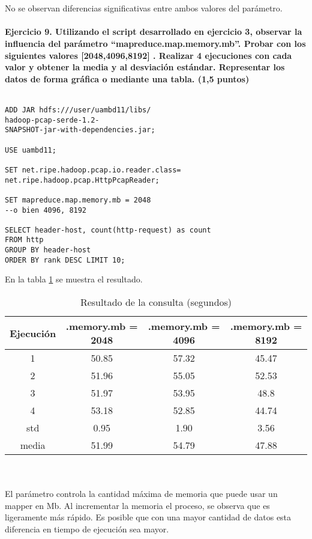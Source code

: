 \\\\
No se observan diferencias significativas entre ambos valores del parámetro.
\\\\
\textbf{Ejercicio 9. Utilizando el script desarrollado en ejercicio 3, observar la influencia del parámetro
	“mapreduce.map.memory.mb”. Probar con los siguientes valores [2048,4096,8192] . Realizar 4
	ejecuciones con cada valor y obtener la media y al desviación estándar. Representar los datos de
	forma gráfica o mediante una tabla. (1,5 puntos)}\\\\
\begin{lstlisting}[caption=Consulta para obtener el ranking de hosts (ampliado)]
ADD JAR hdfs:///user/uambd11/libs/
hadoop-pcap-serde-1.2-
SNAPSHOT-jar-with-dependencies.jar;

USE uambd11;

SET net.ripe.hadoop.pcap.io.reader.class=
net.ripe.hadoop.pcap.HttpPcapReader;

SET mapreduce.map.memory.mb = 2048 
--o bien 4096, 8192

SELECT header-host, count(http-request) as count
FROM http 
GROUP BY header-host 
ORDER BY rank DESC LIMIT 10;
\end{lstlisting}
En la tabla \ref{tab:c9} se muestra el resultado.
\begin{table}[ht]
	\centering
	\caption{Resultado de la consulta (segundos)}
	\begin{tabular}[t]{cccc}
		Ejecución & .memory.mb = 2048& .memory.mb = 4096 & .memory.mb = 8192 \\
		\hline
		
		1&50.85&	57.32 & 45.47\\
		2&51.96&	55.05& 52.53\\
		3&51.97&	53.95& 48.8\\
		4&53.18&	52.85& 44.74\\
		\hline
		std &0.95&	1.90 & 3.56
		\\
		media &51.99 & 54.79 & 47.88
		
	\end{tabular}
	\label{tab:c9}
\end{table}%
\\\\
El parámetro controla la cantidad máxima de memoria que puede usar un mapper en Mb. Al incrementar la memoria el proceso, se observa que es ligeramente más rápido. Es posible que con una mayor cantidad de datos esta diferencia en tiempo de ejecución sea mayor.\\\\
